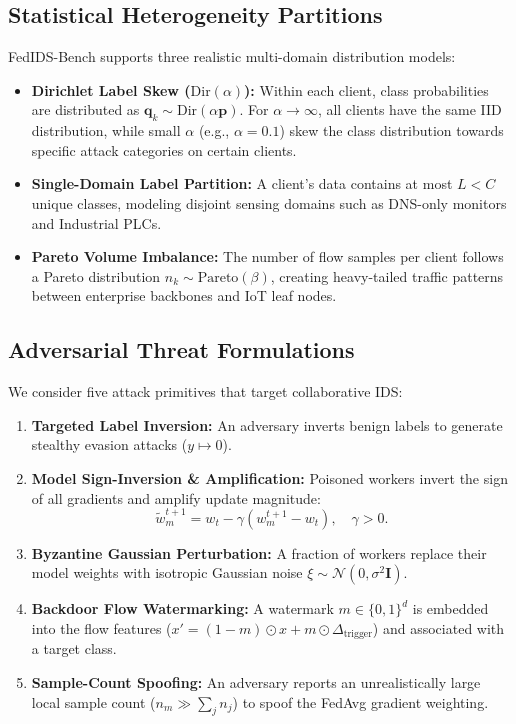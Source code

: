 \documentclass[runningheads]{llncs}
\begin{document}
\subsection{Statistical Heterogeneity Partitions}
FedIDS-Bench supports three realistic multi-domain distribution models:
\begin{itemize}
    \item \textbf{Dirichlet Label Skew ($\text{Dir}(\alpha)$):} Within each client, class probabilities are distributed as $\mathbf{q}_k \sim \text{Dir}(\alpha \mathbf{p})$. For $\alpha \to \infty$, all clients have the same IID distribution, while small $\alpha$ (e.g., $\alpha = 0.1$) skew the class distribution towards specific attack categories on certain clients.
    \item \textbf{Single-Domain Label Partition:} A client's data contains at most $L < C$ unique classes, modeling disjoint sensing domains such as DNS-only monitors and Industrial PLCs.
    \item \textbf{Pareto Volume Imbalance:} The number of flow samples per client follows a Pareto distribution $n_k \sim \text{Pareto}(\beta)$, creating heavy-tailed traffic patterns between enterprise backbones and IoT leaf nodes.
\end{itemize}

\subsection{Adversarial Threat Formulations}
We consider five attack primitives that target collaborative IDS:
\begin{enumerate}
    \item \textbf{Targeted Label Inversion:} An adversary inverts benign labels to generate stealthy evasion attacks ($y \mapsto 0$).
    \item \textbf{Model Sign-Inversion \& Amplification:} Poisoned workers invert the sign of all gradients and amplify update magnitude:
    \begin{equation}
    \tilde{w}_m^{t+1} = w_t - \gamma (w_m^{t+1} - w_t), \quad \gamma > 0.
    \end{equation}
    \item \textbf{Byzantine Gaussian Perturbation:} A fraction of workers replace their model weights with isotropic Gaussian noise $\xi \sim \mathcal{N}(0, \sigma^2 \mathbf{I})$.
    \item \textbf{Backdoor Flow Watermarking:} A watermark $m \in \{0, 1\}^d$ is embedded into the flow features ($x' = (1 - m) \odot x + m \odot \Delta_{\text{trigger}}$) and associated with a target class.
    \item \textbf{Sample-Count Spoofing:} An adversary reports an unrealistically large local sample count ($n_m \gg \sum_j n_j$) to spoof the FedAvg gradient weighting.
\end{enumerate}
\end{document}
